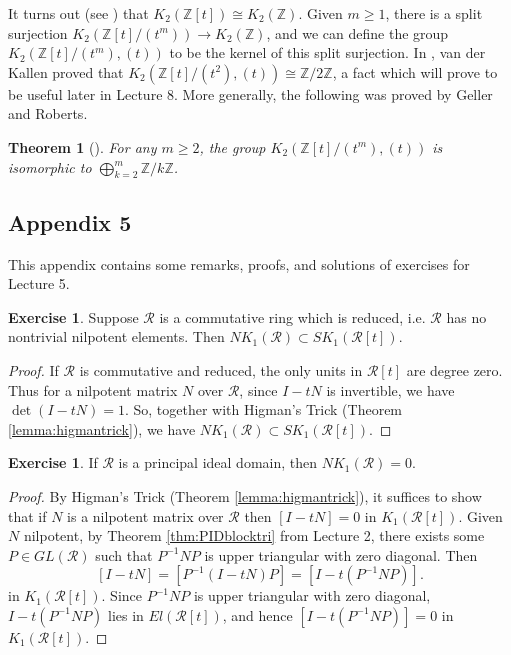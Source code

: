 \documentclass{amsart}
\newtheorem{thm}[equation]{Theorem}
\theoremstyle{definition}
\newtheorem{exer}[equation]{Exercise}
\theoremstyle{definition}
\newcommand{\calR}{\mathcal{R}}
\numberwithin{equation}{subsection}
\begin{document}
It turns out (see \cite[Chapter V]{WeibelBook}) that $K_{2}(\mathbb{Z}[t]) \cong K_{2}(\mathbb{Z})$. Given $m \ge 1$, there is a split surjection $K_{2}(\mathbb{Z}[t]/(t^{m})) \to K_{2}(\mathbb{Z})$, and we can define the group $K_{2}(\mathbb{Z}[t]/(t^{m}),(t))$ to be the kernel of this split surjection. In \cite{vdK}, van der Kallen proved that $K_{2}(\mathbb{Z}[t]/(t^{2}),(t)) \cong \mathbb{Z}/2\mathbb{Z}$, a fact which will prove to be useful later in Lecture 8. More generally, the following was proved by Geller and Roberts.
\begin{thm}[{\cite[Section 7]{Roberts1979}}]\label{thm:k2calctruncatedpoly}
For any $m \ge 2$, the group $K_{2}(\mathbb{Z}[t]/(t^{m}),(t))$ is isomorphic to $\bigoplus_{k=2}^{m}\mathbb{Z}/k\mathbb{Z}$.
\end{thm}

\subsection{Appendix 5}
This appendix contains some remarks, proofs, and solutions of exercises for Lecture 5.

\begin{exer}\label{appexer:reducednk1sk1}
Suppose $\calR$ is a commutative ring which is reduced, i.e. $\calR$ has no nontrivial nilpotent elements. Then $NK_{1}(\calR) \subset SK_{1}(\calR[t])$.
\end{exer}
\begin{proof}
  If $\calR$ is commutative and reduced, the only units in $\calR[t]$ are degree zero. Thus for a nilpotent matrix $N$ over $\calR$, since $I-tN$ is invertible,
  we have $\det(I-tN)= 1$.  So,  together with Higman's Trick (Theorem \ref{lemma:higmantrick}), we have $NK_{1}(\calR) \subset SK_{1}(\calR[t])$.
\end{proof}

\begin{exer}\label{appexer:nk1vanishpid}
If $\calR$ is a principal ideal domain, then $NK_{1}(\calR) = 0$.
\end{exer}
\begin{proof}
By Higman's Trick (Theorem \ref{lemma:higmantrick}), it suffices to show that if $N$ is a nilpotent matrix over $\calR$ then $[I-tN] = 0$ in $K_{1}(\calR[t])$. Given $N$ nilpotent, by Theorem \ref{thm:PIDblocktri} from Lecture 2, there exists some $P \in GL(\calR)$ such that $P^{-1}NP$ is upper triangular with zero diagonal. Then
$$[I-tN] = [P^{-1}(I-tN)P] = [I-t(P^{-1}NP)].$$
in $K_{1}(\calR[t])$. Since $P^{-1}NP$ is upper triangular with zero diagonal, $I-t(P^{-1}NP)$ lies in $El(\calR[t])$, and hence $[I-t(P^{-1}NP)] = 0$ in $K_{1}(\calR[t])$.
\end{proof}
\end{document}
